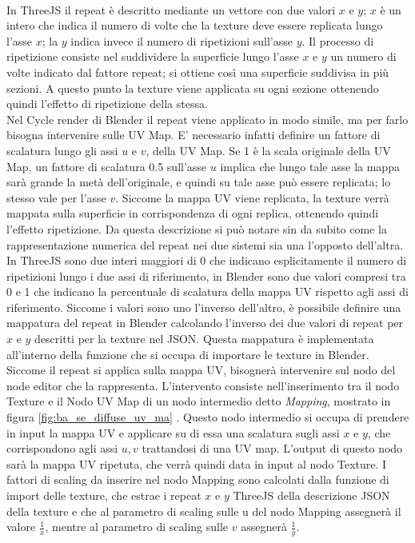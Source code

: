 \\
In ThreeJS il repeat è descritto mediante un vettore con due valori $x$ e $y$; $x$ è un intero che indica il numero di volte che la texture deve essere replicata lungo l’asse $x$; la $y$ indica invece il numero di ripetizioni sull’asse $y$. Il processo di ripetizione consiste nel suddividere la superficie lungo l’asse $x$ e $y$ un numero di volte indicato dal fattore repeat; si ottiene così una superficie suddivisa in più sezioni. A questo punto la texture viene applicata su ogni sezione ottenendo quindi l’effetto di ripetizione della stessa.
\\
Nel Cycle render di Blender il repeat viene applicato in modo simile, ma per farlo  bisogna intervenire sulle UV Map. E’ necessario infatti definire un fattore di scalatura lungo gli assi $u$ e $v$, della UV Map. Se 1 è la scala originale della UV Map, un fattore di scalatura 0.5 sull’asse $u$ implica che lungo tale asse la mappa sarà grande la metà dell’originale, e quindi su tale asse può essere replicata; lo stesso vale per l’asse $v$. Siccome la mappa UV viene replicata, la texture verrà mappata sulla superficie in corrispondenza di ogni replica, ottenendo quindi l’effetto ripetizione. Da questa descrizione si può notare sin da subito come la rappresentazione numerica del repeat nei due sistemi sia una l’opposto dell’altra. In ThreeJS sono due interi maggiori di 0 che indicano esplicitamente il numero di ripetizioni lungo i due assi di riferimento, in Blender sono due valori compresi tra 0 e 1 che indicano la percentuale di scalatura della mappa UV rispetto agli assi di riferimento. Siccome i valori sono uno l’inverso dell’altro, è possibile definire una mappatura del repeat in Blender calcolando l’inverso dei due valori di repeat per $x$ e $y$ descritti per la texture nel JSON. Questa mappatura è implementata all’interno della funzione che si occupa di importare le texture in Blender. Siccome il repeat si applica sulla mappa UV, bisognerà intervenire sul nodo del node editor che la rappresenta. L’intervento consiste nell’inserimento tra il nodo Texture e il Nodo UV Map di un nodo intermedio detto \emph{Mapping}, mostrato in figura \ref{fig:ba_se_diffuse_uv_ma} . Questo nodo intermedio si occupa di prendere in input la mappa UV e applicare su di essa una scalatura sugli assi $x$ e $y$, che corrispondono agli assi $u,v$ trattandosi di una UV map. L’output di questo nodo sarà la mappa UV ripetuta, che verrà quindi data in input al nodo Texture. I fattori di scaling da inserire nel nodo Mapping sono calcolati dalla funzione di import delle texture, che estrae i repeat $x$ e $y$ ThreeJS della descrizione JSON della texture e che al parametro di scaling sulle u del nodo Mapping assegnerà il valore $\frac{1}{x}$, mentre al parametro di scaling sulle $v$ assegnerà $\frac{1}{y}$.
